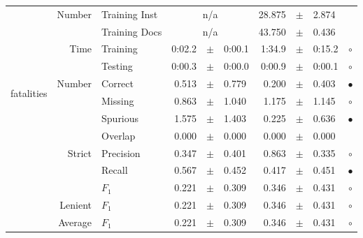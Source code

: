 \begin{longtable}{|r|r|l||rcl|rcl|c|}
\cline{2-10} & \multirow{2}{*}{    Number} &   Training Inst &    \multicolumn{3}{c|}{n/a}         &      28.875 &  $\pm$  &       2.874 &  \\
\cline{3-10} &                             &   Training Docs &    \multicolumn{3}{c|}{n/a}         &      43.750 &  $\pm$  &       0.436 &  \\
\cline{2-10} & \multirow{2}{*}{      Time} &        Training &      0:02.2 &  $\pm$  &      0:00.1 &      1:34.9 &  $\pm$  &      0:15.2 & $\circ$ \\
\cline{3-10} &                             &         Testing &      0:00.3 &  $\pm$  &      0:00.0 &      0:00.9 &  $\pm$  &      0:00.1 & $\circ$ \\
\hline
\hline
\multirow{11}{*}{\begin{sideways}fatalities\end{sideways} }
             & \multirow{4}{*}{    Number} &         Correct &       0.513 &  $\pm$  &       0.779 &       0.200 &  $\pm$  &       0.403 & $\bullet$ \\
\cline{3-10} &                             &         Missing &       0.863 &  $\pm$  &       1.040 &       1.175 &  $\pm$  &       1.145 & $\circ$ \\
\cline{3-10} &                             &        Spurious &       1.575 &  $\pm$  &       1.403 &       0.225 &  $\pm$  &       0.636 & $\bullet$ \\
\cline{3-10} &                             &         Overlap &       0.000 &  $\pm$  &       0.000 &       0.000 &  $\pm$  &       0.000 &  \\
\cline{2-10} & \multirow{3}{*}{    Strict} &       Precision &       0.347 &  $\pm$  &       0.401 &       0.863 &  $\pm$  &       0.335 & $\circ$ \\
\cline{3-10} &                             &          Recall &       0.567 &  $\pm$  &       0.452 &       0.417 &  $\pm$  &       0.451 & $\bullet$ \\
\cline{3-10} &                             &           $F_1$ &       0.221 &  $\pm$  &       0.309 &       0.346 &  $\pm$  &       0.431 & $\circ$ \\
\cline{2-10} &                     Lenient &           $F_1$ &       0.221 &  $\pm$  &       0.309 &       0.346 &  $\pm$  &       0.431 & $\circ$ \\
\cline{2-10} &                     Average &           $F_1$ &       0.221 &  $\pm$  &       0.309 &       0.346 &  $\pm$  &       0.431 & $\circ$ \\

\end{longtable}

